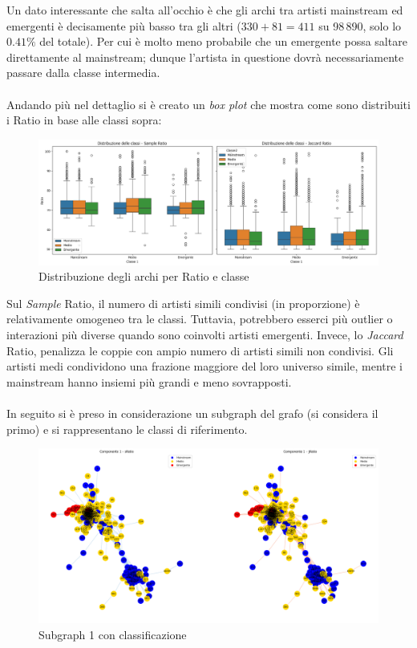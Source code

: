 \documentclass[sigchi]{acmart}
\begin{document}
\noindent Un dato interessante che salta all'occhio è che gli archi tra artisti mainstream ed emergenti è decisamente più basso tra gli altri ($330+81=411$ su 98\,890, solo lo $0.41\%$ del totale). Per cui è molto meno probabile che un emergente possa saltare direttamente al mainstream; dunque l'artista in questione dovrà necessariamente passare dalla classe intermedia. \\ \\ Andando più nel dettaglio si è creato un {\itshape box plot} che mostra come sono distribuiti i Ratio in base alle classi sopra:

\begin{figure}[H]
\centering
\includegraphics[width=0.45
\textwidth]{../open_problem/plots/3_2/clDist.png}
\caption{Distribuzione degli archi per Ratio e classe}
\label{fig:clDist}
\end{figure}

\noindent Sul {\itshape Sample} Ratio, il numero di artisti simili condivisi (in proporzione) è relativamente omogeneo tra le classi. Tuttavia, potrebbero esserci più outlier o interazioni più diverse quando sono coinvolti artisti emergenti. Invece, lo {\itshape Jaccard} Ratio, penalizza le coppie con ampio numero di artisti simili non condivisi. Gli artisti medi condividono una frazione maggiore del loro universo simile, mentre i mainstream hanno insiemi più grandi e meno sovrapposti. \\ \\ In seguito si è preso in considerazione un subgraph del grafo (si considera il primo) e si rappresentano le classi di riferimento.

\begin{figure}[H]
\centering
\includegraphics[width=0.45
\textwidth]{../open_problem/plots/3_2/clSubgraph_1.png}
\caption{Subgraph 1 con classificazione}
\label{fig:clSubgraph_1}
\end{figure}
\end{document}

